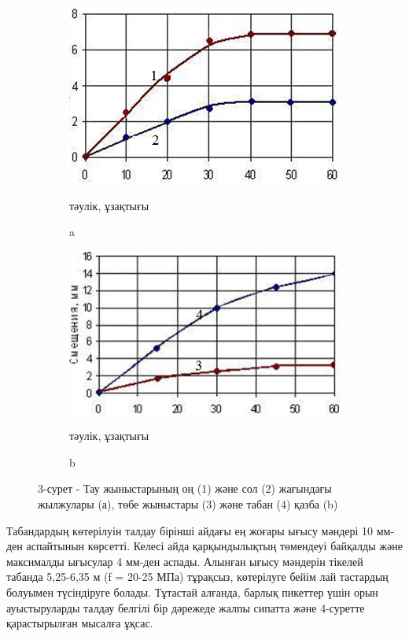 \begin{figure}[H]
    \centering
    \begin{subfigure}[b]{0.45\textwidth}
        \centering
        \includegraphics[width=\linewidth]{assets/1323}
		\caption*{тәулік, ұзақтығы}
		\caption*{a}
    \end{subfigure}
    \hfill
    \begin{subfigure}[b]{0.45\textwidth}
        \centering
        \includegraphics[width=\linewidth]{assets/1323.1}
		\caption*{тәулік, ұзақтығы}
		\caption*{b}
    \end{subfigure}
  \caption*{3-сурет - Тау жыныстарының оң (1) және сол (2) жағындағы жылжулары (а), төбе жыныстары (3) және табан (4) қазба (b)}
\end{figure}

\begin{multicols}{2}
Табандардың көтерілуін талдау бірінші айдағы ең жоғары ығысу мәндері 10
мм-ден аспайтынын көрсетті. Келесі айда қарқындылықтың төмендеуі
байқалды және максималды ығысулар 4 мм-ден аспады. Алынған ығысу
мәндерін тікелей табанда 5,25-6,35 м (f = 20-25 МПа) тұрақсыз,
көтерілуге бейім лай тастардың болуымен түсіндіруге болады. Тұтастай
алғанда, барлық пикеттер үшін орын ауыстыруларды талдау белгілі бір
дәрежеде жалпы сипатта және 4-суретте қарастырылған мысалға ұқсас.
\end{multicols}

